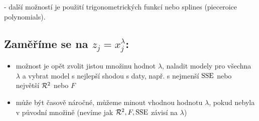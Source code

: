 - další možností je použití trigonometrických funkcí nebo splines (pieceroice polynomials).

\subsection*{Zaměříme se na $z_j=x_j^\lambda$:}
\begin{itemize}
	\item možnost je opět zvolit jistou množinu hodnot $\lambda$, naladit modely pro všechna $\lambda$ a vybrat model s nejlepší shodou s daty, např. s nejmenší $\mathrm{SSE}$ nebo největší $\mathcal{R}^2$ nebo $F$
	\item může být časově náročné, můžeme minout vhodnou hodnotu $\lambda$, pokud nebyla v původní množině (nevíme jak $\mathcal{R}^2,F,\mathrm{SSE}$ závisí na $\lambda$)
\end{itemize}
